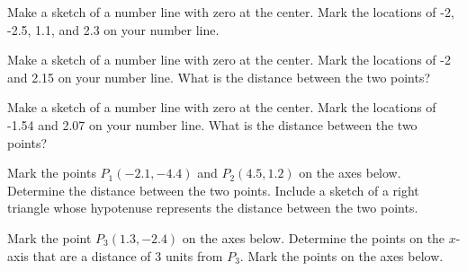 
\begin{problem}
\item Make a sketch of a number line with zero at the center.  Mark
  the locations of -2, -2.5, 1.1, and 2.3 on your number line.

  \vfill

\item Make a sketch of a number line with zero at the center.  Mark
  the locations of -2 and 2.15 on your number line. What is the
  distance between the two points?

  \vfill

\item Make a sketch of a number line with zero at the center.  Mark
  the locations of -1.54 and 2.07 on your number line. What is the
  distance between the two points?

  \vfill

\end{problem}


\begin{problem}
\item Mark the points $P_1(-2.1,-4.4)$ and $P_2(4.5,1.2)$ on the axes
  below. Determine the distance between the two points.  Include a
  sketch of a right triangle whose hypotenuse represents the distance
  between the two points.

  \scalebox{0.95}{}

  \vfill

  \clearpage

\item Mark the point $P_3(1.3,-2.4)$ on the axes below. Determine the
  points on the $x$-axis that are a distance of 3 units from $P_3$.
   Mark the points on
  the axes below.

  \scalebox{0.95}{}

  \vfill
\end{problem}


\postClass

